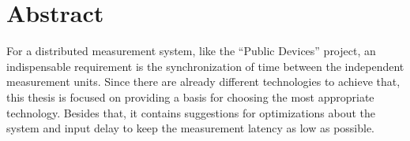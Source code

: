 \chapter{Abstract}
\label{ch:abstract}


For a distributed measurement system, like the “Public Devices” project, an indispensable requirement is the synchronization of time between the independent measurement units. Since there are already different technologies to achieve that, this thesis is focused on providing a basis for choosing the most appropriate technology. Besides that, it contains suggestions for optimizations about the system and input delay to keep the measurement latency as low as possible.

